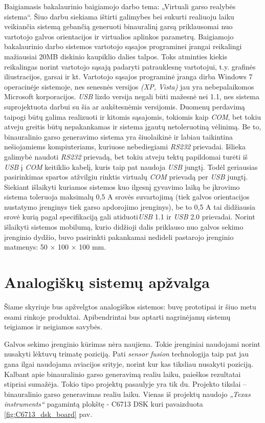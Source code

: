 \documentclass[]{vgtuef}
\begin{document}
Baigiamasis bakalaurinio baigiamojo darbo tema: „Virtuali garso realybės sistema“. Šiuo darbu siekiama ištirti galimybes bei sukurti realiuoju laiku veikiančia sistemą gebančią generuoti binauralinį garsą priklausomai nuo vartotojo galvos orientacijos ir virtualios aplinkos parametrų.
Baigiamojo bakalaurinio darbo sistemos vartotojo sąsajos programinei įrangai reikalingi mažiausiai 20MB diskinio kaupiklio dalies talpos. Toks atminties kiekis reikalingas norint vartotojo sąsają padaryti patrauklesnę vartotojui, t.y. grafinės iliustracijos, garsai ir kt.
Vartotojo sąsajos programinė įranga dirba Windows 7 operacinėje sistemoje, nes senesnės versijos \textit{(XP, Vista)} jau yra nebepalaikomos Microsoft korporacijos.
\textit{USB} lizdo versija negali būti mažesnė nei 1.1, nes sistema suprojektuota darbui su šia ar aukštesnėmis versijomis. Duomenų perdavimą taipogi būtų galima realizuoti ir kitomis sąsajomis, tokiomis kaip \textit{COM}, bet tokiu atveju greitis būtų nepakankamas ir sistema įgautų netoleruotiną vėlinimą. Be to, binauralinio garso generavimo sistema yra šiuolaikinė ir labiau taikintina nešiojamiems kompiuteriams, kuriuose nebediegiami \textit{RS232} prievadai. Išlieka galimybė naudoti \textit{RS232} prievadą, bet tokiu atveju tektų papildomai turėti iš \textit{USB} į \textit{COM} keitiklio kabelį, kuris taip pat naudoja \textit{USB} jungtį. Todėl geriausias pasirinkimas spartos atžvilgiu rinktis virtualų \textit{COM} prievadą per \textit{USB} jungtį.
Siekiant išlaikyti kuriamos sistemos kuo ilgesnį gyvavimo laiką be įkrovimo sistema toleruoja maksimalų 0,5 A srovės suvartojimą (tiek galvos orientacijos nustatymo įrenginys tiek garso apdorojimo įrenginys), be to 0,5 A tai didžiausia srovė kurią pagal specifikaciją gali atiduoti\textit{USB} 1.1 ir \textit{USB} 2.0 prievadai.
Norint išlaikyti sistemos mobilumą, kurio didžioji dalis priklauso nuo galvos sekimo įrenginio dydžio, buvo pasirinkti pakankamai nedideli pastarojo įrenginio matmenys: 50 × 100 × 100 mm.  

\section{Analogiškų sistemų apžvalga}

Šiame skyriuje bus apžvelgtos analogiškos sistemos: buvę prototipai ir šiuo metu esami rinkoje produktai. Apibendrintai bus aptarti nagrinėjamų sistemų teigiamos ir neigiamos savybės. 


Galvos sekimo įrenginio kūrimas nėra naujiena. Tokie įrenginiai naudojami norint nusakyti lėktuvų  trimatę poziciją. Pati \textit{sensor fusion} technologija taip pat jau gana ilgai naudojama aviacijos srityje, norint kur kas tiksliau nusakyti poziciją.
Kalbant apie binauralinio garso generavimą realiu laiku, paieškos rezultatai stipriai sumažėja. Tokio tipo projektų pasaulyje yra tik du. Projekto tikslai – binauralinio garso generavimas realiu laiku. Vienas iš projektų naudojo \textit{„Texas instruments“} pagamintą plokštę - C6713 DSK kuri pavaizduota \ref{fig:C6713_dsk_board} pav.
\end{document}
